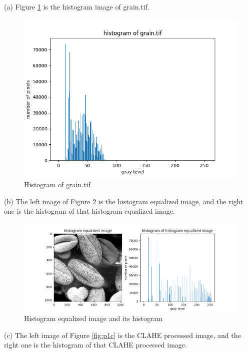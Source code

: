 \problem{}
(a) Figure \ref{fig:p1a} is the histogram image of grain.tif.\\

\begin{figure}[htbp]
    \centering
	\includegraphics[width=\textwidth]{../images/p1/p1a.png}
    \caption{Histogram of grain.tif}
    \label{fig:p1a}
\end{figure}

(b) The left image of Figure \ref{fig:p1b} is the histogram equalized image, and the right one is 
the histogram of that histogram equalized image.\\

\begin{figure}[htbp]
    \centering
	\includegraphics[width=\textwidth]{../images/p1/p1b.png}
    \caption{Histogram equalized image and its histogram}
    \label{fig:p1b}
\end{figure}

(c) The left image of Figure \ref{fig:p1c} is the CLAHE processed image, and the right one is 
the histogram of that CLAHE processed image.\\

